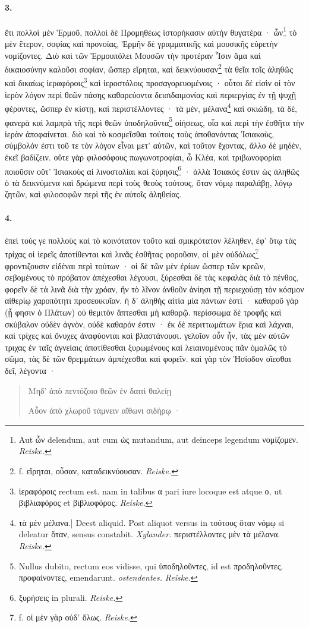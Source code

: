 \documentclass[a4paper, 11pt, oneside, polutonikogreek, german, landscape]{article}
\begin{document}
\paragraph{3.}
ἔτι πολλοὶ μὲν Ἑρμοῦ, πολλοὶ δὲ Προμηθέως ἱστορήκασιν αὐτὴν θυγατέρα · ὧν\footnote{Aut ὧν delendum, aut cum ὡς mutandum, aut deinceps legendum νομίζομεν. \emph{Reiske.}} τὸ μὲν ἕτερον, σοφίας καὶ προνοίας, Ἑρμῆν δὲ γραμματικῆς καὶ μουσικῆς εὑρετὴν νομίζοντες. Διὸ καὶ τῶν Ἑρμουπόλει Μουσῶν τὴν προτέραν Ἶσιν ἅμα καὶ δικαιοσύνην καλοῦσι σοφίαν, ὥσπερ εἴρηται, καὶ δεικνύουσαν\footnote{f. εἴρηται, οὖσαν, καταδεικνύουσαν. \emph{Reiske.}} τὰ θεῖα τοῖς ἀληθῶς καὶ δικαίως ἱεραφόροις\footnote{ἱεραφόροις rectum est. nam in talibus α pari iure locoque est atque ο, ut βιβλιαφόρος et βιβλιοφόρος. \emph{Reiske.}} καὶ ἱεροστόλοις προσαγορευομένοις · οὗτοι δέ εἰσὶν οἱ τὸν ἱερὸν λόγον περὶ θεῶν πάσης καθαρεύοντα δεισιδαιμονίας καὶ περιεργίας ἐν τῇ ψυχῇ φέροντες, ὥσπερ ἐν κίστῃ, καὶ περιστέλλοντες · τὰ μὲν, μέλανα\footnote{τὰ μὲν μέλανα.] Deest aliquid. Post aliquot versus in τούτους ὅταν νόμῳ si deleatur ὅταν, sensus constabit. \emph{Xylander.} περιστέλλοντες μὲν τὰ μέλανα. \emph{Reiske.}} καὶ σκιώδη, τὰ δὲ, φανερὰ καὶ λαμπρὰ τῆς περὶ θεῶν ὑποδηλοῦντα\footnote{Nullus dubito, rectum eos vidisse, qui ὑποδηλοῦντες, id est προδηλοῦντες, προφαίνοντες, emendarunt. \emph{ostendentes.} \emph{Reiske.}} οἰήσεως, οἷα καὶ περὶ τὴν ἐσθῆτα τὴν ἱερὰν ἀποφαίνεται. διὸ καὶ τὸ κοσμεῖσθαι τούτοις τοὺς ἀποθανόντας Ἰσιακοὺς, σύμβολόν ἐστι τοῦ τε τὸν λόγον εἶναι μετ' αὐτῶν, καὶ τοῦτον ἔχοντας, ἄλλο δὲ μηδὲν, ἐκεῖ βαδίζειν. οὔτε γὰρ φιλοσόφους πωγωνοτροφίαι, ὦ Κλέα, καὶ τριβωνοφορίαι ποιοῦσιν οὔτ' Ἰσιακοὺς αἱ λινοστολίαι καὶ ξύρησις\footnote{ξυρήσεις in plurali. \emph{Reiske.}} · ἀλλὰ Ἰσιακός ἐστιν ὡς ἀληθῶς ὁ τὰ δεικνύμενα καὶ δρώμενα περὶ τοὺς θεοὺς τούτους, ὅταν νόμῳ παραλάβῃ, λόγῳ ζητῶν, καὶ φιλοσοφῶν περὶ τῆς ἐν αὐτοῖς ἀληθείας.

\paragraph{4.}
ἐπεὶ τούς γε πολλοὺς καὶ τὸ κοινότατον τοῦτο καὶ σμικρότατον λέληθεν, ἐφ' ὅτῳ τὰς τρίχας οἱ ἱερεῖς ἀποτίθενται καὶ λινᾶς ἐσθῆτας φοροῦσιν, οἱ μὲν οὐδόλως\footnote{f. οἱ μὲν γὰρ οὐδ' ὅλως. \emph{Reiske.}} φροντιζουσιν εἰδέναι περὶ τούτων · οἱ δὲ τῶν μὲν ἐρίων ὥσπερ τῶν κρεῶν, σεβομένους τὸ πρόβατον ἀπέχεσθαι λέγουσι, ξύρεσθαι δὲ τὰς κεφαλὰς διὰ τὸ πένθος, φορεῖν δὲ τὰ λινᾶ διὰ τὴν χρόαν, ἣν τὸ λῖνον ἀνθοῦν ἀνίησι τῇ περιεχούσῃ τὸν κόσμον αἰθερίῳ χαροπότητι προσεοικυῖαν. ἡ δ' ἀληθὴς αἰτία μία πάντων ἐστί · καθαροῦ γὰρ (ᾗ φησιν ὁ Πλάτων) οὐ θεμιτὸν ἅπτεσθαι μὴ καθαρῷ. περίσσωμα δὲ τροφῆς καὶ σκύβαλον οὐδὲν ἁγνὸν, οὐδὲ καθαρόν ἐστιν · ἐκ δὲ περιττωμάτων ἔρια καὶ λάχναι, καὶ τρίχες καὶ ὄνυχες ἀναφύονται καὶ βλαστάνουσι. γελοῖον οὖν ἦν, τὰς μὲν αὐτῶν τριχας ἐν ταῖς ἁγνείαις ἀποτίθεσθαι ξυρωμένους καὶ λειαινομένους πᾶν ὁμαλῶς τὸ σῶμα, τὰς δὲ τῶν θρεμμάτων ἀμπέχεσθαι καὶ φορεῖν. καὶ γὰρ τὸν Ἡσίοδον οἴεσθαι δεῖ, λέγοντα ·
\begin{quotation}\small
Μηδ' ἀπὸ πεντόζοιο θεῶν ἐν δαιτὶ θαλείῃ

Αὖον ἀπὸ χλωροῦ τάμνειν αἴθωνι σιδήρῳ ·
\end{quotation}
\end{document}
